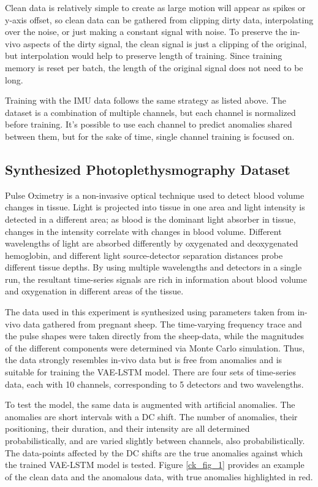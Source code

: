 \documentclass[conference]{IEEEtran}
\begin{document}
Clean data is relatively simple to create as large motion will appear as spikes or y-axis offset, so clean data can be gathered from clipping dirty data, interpolating over the noise, or just making a constant signal with noise. To preserve the in-vivo aspects of the dirty signal, the clean signal is just a clipping of the original, but interpolation would help to preserve length of training. Since training memory is reset per batch, the length of the original signal does not need to be long.

Training with the IMU data follows the same strategy as listed above. The dataset is a combination of multiple channels, but each channel is normalized before training. It’s possible to use each channel to predict anomalies shared between them, but for the sake of time, single channel training is focused on.

\subsection{Synthesized Photoplethysmography Dataset}
Pulse Oximetry is a non-invasive optical technique used to detect blood volume changes in tissue. Light is projected into tissue in one area and light intensity is detected in a different area; as blood is the dominant light absorber in tissue, changes in the intensity correlate with changes in blood volume. Different wavelengths of light are absorbed differently by oxygenated and deoxygenated hemoglobin, and different light source-detector separation distances probe different tissue depths. By using multiple wavelengths and detectors in a single run, the resultant time-series signals are rich in information about blood volume and oxygenation in different areas of the tissue.

The data used in this experiment is synthesized using parameters taken from in-vivo data gathered from pregnant sheep. The time-varying frequency trace and the pulse shapes were taken directly from the sheep-data, while the magnitudes of the different components were determined via Monte Carlo simulation. Thus, the data strongly resembles in-vivo data but is free from anomalies and is suitable for training the VAE-LSTM model. There are four sets of time-series data, each with 10 channels, corresponding to 5 detectors and two wavelengths.

To test the model, the same data is augmented with artificial anomalies. The anomalies are short intervals with a DC shift. The number of anomalies, their positioning, their duration, and their intensity are all determined probabilistically, and are varied slightly between channels, also probabilistically. The data-points affected by the DC shifts are the true anomalies against which the trained VAE-LSTM model is tested. Figure \ref{ck_fig_1} provides an example of the clean data and the anomalous data, with true anomalies highlighted in red.
\end{document}
